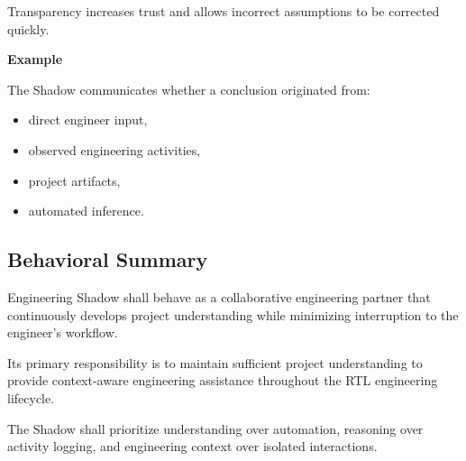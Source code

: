 Transparency increases trust and allows incorrect assumptions to be corrected quickly.

\textbf{Example}

The Shadow communicates whether a conclusion originated from:

\begin{itemize}
    \item direct engineer input,
    \item observed engineering activities,
    \item project artifacts,
    \item automated inference.
\end{itemize}

\vspace{0.5cm}

\subsection{Behavioral Summary}

Engineering Shadow shall behave as a collaborative engineering partner that continuously develops project understanding while minimizing interruption to the engineer's workflow.

Its primary responsibility is to maintain sufficient project understanding to provide context-aware engineering assistance throughout the RTL engineering lifecycle.

The Shadow shall prioritize understanding over automation, reasoning over activity logging, and engineering context over isolated interactions.